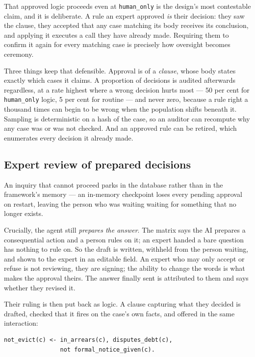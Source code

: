\documentclass[sigconf,nonacm]{acmart}
\begin{document}
That approved logic proceeds even at \texttt{human\_only} is the design's most
contestable claim, and it is deliberate. A rule an expert approved \emph{is}
their decision: they saw the clause, they accepted that any case matching its
body receives its conclusion, and applying it executes a call they have already
made. Requiring them to confirm it again for every matching case is precisely
how oversight becomes ceremony.

Three things keep that defensible. Approval is of a \emph{clause}, whose body
states exactly which cases it claims. A proportion of decisions is audited
afterwards regardless, at a rate highest where a wrong decision hurts most ---
50 per cent for \texttt{human\_only} logic, 5 per cent for routine --- and never
zero, because a rule right a thousand times can begin to be wrong when the
population shifts beneath it. Sampling is deterministic on a hash of the case,
so an auditor can recompute why any case was or was not checked. And an approved
rule can be retired, which enumerates every decision it already made.

\subsection{Expert review of prepared decisions}

An inquiry that cannot proceed parks in the database rather than in the
framework's memory --- an in-memory checkpoint loses every pending approval on
restart, leaving the person who was waiting waiting for something that no longer
exists.

Crucially, the agent still \emph{prepares the answer}. The matrix says the AI
prepares a consequential action and a person rules on it; an expert handed a
bare question has nothing to rule on. So the draft is written, withheld from the
person waiting, and shown to the expert in an editable field. An expert who may
only accept or refuse is not reviewing, they are signing; the ability to change
the words is what makes the approval theirs. The answer finally sent is
attributed to them and says whether they revised it.

Their ruling is then put back as logic. A clause capturing what they decided is
drafted, checked that it fires on the case's own facts, and offered in the same
interaction:

\begin{lstlisting}
not_evict(c) <- in_arrears(c), disputes_debt(c),
                not formal_notice_given(c).
\end{lstlisting}
\end{document}
